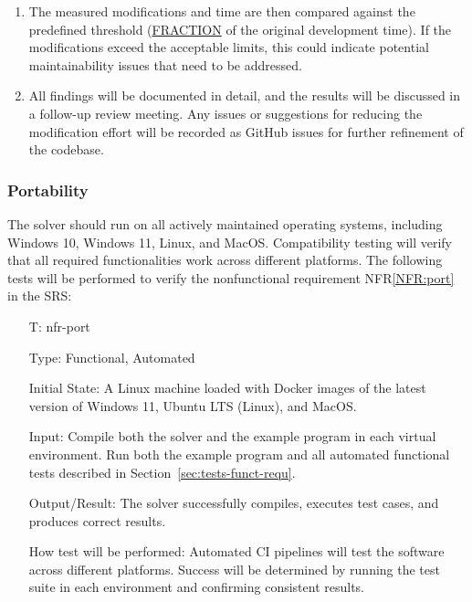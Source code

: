 \documentclass[12pt, titlepage]{article}
\newcounter{testnum} %
\newcommand{\nfrref}[1]{NFR\ref{#1}}
\begin{document}
\begin{itemize}
\begin{enumerate}
\begin{itemize}
  \end{itemize}
\item The measured modifications and time are then compared against the predefined
  threshold (\hyperref[tab:symbolic]{FRACTION} of the original development
  time). If the modifications exceed the acceptable limits, this could indicate
  potential maintainability issues that need to be addressed.
\item All findings will be documented in detail, and the results will be discussed
  in a follow-up review meeting. Any issues or suggestions for reducing the
  modification effort will be recorded as GitHub issues for further refinement
  of the codebase.
\end{enumerate}

\end{itemize}

\subsubsection{Portability}

The solver should run on all actively maintained operating systems, including
Windows 10, Windows 11, Linux, and MacOS. Compatibility testing will verify that
all required functionalities work across different platforms. The following
tests will be performed to verify the nonfunctional requirement \nfrref{NFR:port}
in the SRS:

\begin{itemize}

\item[T\refstepcounter{testnum}\thetestnum \label{T:port}:]{nfr-port}

Type: Functional, Automated

Initial State: A Linux machine loaded with Docker images of the latest version
of Windows 11, Ubuntu LTS (Linux), and MacOS.

Input: Compile both the solver and the example program in each virtual
environment. Run both the example program and all automated functional tests
described in Section~\ref{sec:tests-funct-requ}.

Output/Result: The solver successfully compiles, executes test cases, and
produces correct results.

How test will be performed: Automated CI pipelines will test the software across
different platforms. Success will be determined by running the test suite in
each environment and confirming consistent results.

\end{itemize}
\end{document}
